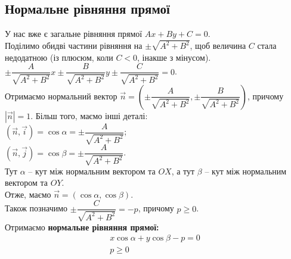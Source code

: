 \documentclass[a4paper, 10pt]{extarticle}
\theoremstyle{theoremdd}
\theoremstyle{theoremdd}
\theoremstyle{theoremdd}
\theoremstyle{theoremdd}
\theoremstyle{theoremdd}
\theoremstyle{theoremdd}
\theoremstyle{theoremdd}
\theoremstyle{theoremdd}
\begin{document}
\subsection{Нормальне рівняння прямої}
У нас вже є загальне рівняння прямої $Ax + By + C = 0$.\\
Поділимо обидві частини рівняння на $\pm \sqrt{A^2+B^2}$, щоб величина $C$ стала недодатною (із плюсюм, коли $C<0$, інакше з мінусом).\\
$\pm \dfrac{A}{\sqrt{A^2+B^2}}x \pm \dfrac{B}{\sqrt{A^2+B^2}}y \pm \dfrac{C}{\sqrt{A^2+B^2}} = 0$.\\
Отримаємо нормальний вектор $\vec{n} = \left(\pm \dfrac{A}{\sqrt{A^2+B^2}}, \pm \dfrac{B}{\sqrt{A^2+B^2}} \right)$, причому $|\vec{n}| = 1$. Більш того, маємо інші деталі:\\
$(\vec{n}, \vec{i}) = \cos \alpha = \pm \dfrac{A}{\sqrt{A^2+B^2}}$;\\
$(\vec{n}, \vec{j}) = \cos \beta = \pm \dfrac{A}{\sqrt{A^2+B^2}}$.\\
Тут $\alpha$ -- кут між нормальним вектором та $OX$, а тут $\beta$ -- кут між нормальним вектором та $OY$.\\
Отже, маємо $\vec{n} = (\cos \alpha, \cos \beta)$.\\
Також позначимо $\pm \dfrac{C}{\sqrt{A^2+B^2}} = -p$, причому $p \geq 0$.\\
Отримаємо \textbf{нормальне рівняння прямої:}
\begin{align*}
x \cos \alpha + y \cos \beta - p = 0\\
p \geq 0
\end{align*}

\begin{figure}[H]
\centering
{}
\end{figure}
\end{document}
